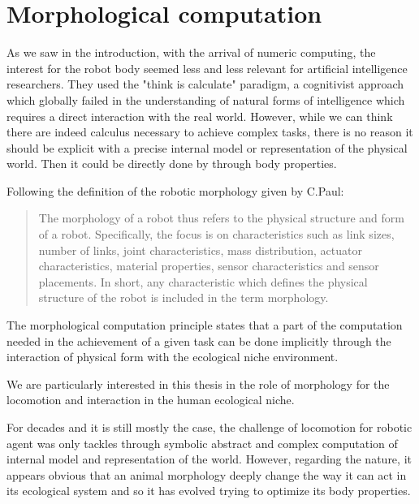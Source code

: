 

\section{Morphological computation} %

As we saw in the introduction, with the arrival of numeric computing, the interest for the robot body seemed less and less relevant for artificial intelligence researchers. They used the "think is calculate" paradigm, a cognitivist approach which globally failed in the understanding of natural forms of intelligence which requires a direct interaction with the real world.
However, while we can think there are indeed calculus necessary to achieve complex tasks, there is no reason it should be explicit with a precise internal model or representation of the physical world. Then it could be directly done by through body properties.

Following the definition of the robotic morphology given by C.Paul:
\begin{quotation}
The morphology of a robot thus refers to the physical structure and form of a robot. Specifically, the focus is on characteristics such as link sizes, number of links, joint characteristics, mass distribution, actuator characteristics, material properties, sensor characteristics and sensor placements. In short, any characteristic which defines the physical structure of the robot is included in the term morphology.
\end{quotation}

The morphological computation principle states that a part of the computation needed in the achievement of a given task can be done implicitly through the interaction of physical form with the ecological niche environment.

We are particularly interested in this thesis in the role of morphology for the locomotion and interaction in the human ecological niche.

For decades and it is still mostly the case, the challenge of locomotion for robotic agent was only tackles through symbolic abstract and complex computation of internal model and representation of the world. However, regarding the nature, it appears obvious that an animal morphology deeply change the way it can act in its ecological system and so it has evolved trying to optimize its body properties.

